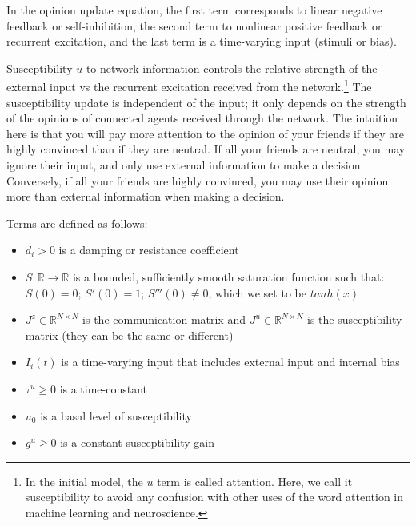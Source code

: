 \documentclass[]{article}
\begin{document}
In the opinion update equation, the first term corresponds to linear negative feedback or self-inhibition, the second term to nonlinear positive feedback or recurrent excitation, and the last term is a time-varying input (stimuli or bias).

Susceptibility $u$ to network information controls the relative strength of the external input vs the recurrent excitation received from the network.\footnote{In the initial model, the $u$ term is called attention. Here, we call it susceptibility to avoid any confusion with other uses of the word attention in machine learning and neuroscience.} The susceptibility update is independent of the input; it only depends on the strength of the opinions of connected agents received through the network. The intuition here is that you will pay more attention to the opinion of your friends if they are highly convinced than if they are neutral. If all your friends are neutral, you may ignore their input, and only use external information to make a decision. Conversely, if all your friends are highly convinced, you may use their opinion more than external information when making a decision.

Terms are defined as follows:
\begin{itemize}
	\item $d_{i} > 0$ is a damping or resistance coefficient 
	\item $S: \mathbb{R} \rightarrow \mathbb{R}$ is a bounded, sufficiently smooth saturation function such that: $S(0)=0$; $S'(0)=1$; $S'''(0)\neq0$, which we set to be $tanh(x)$
	\item $J^z \in \mathbb{R}^{N \times N}$ is the communication matrix and $J^u \in \mathbb{R}^{N \times N}$ is the susceptibility matrix (they can be the same or different)
	\item $I_i(t)$ is a time-varying input that includes external input and internal bias
	\item $\tau^u \geq 0$ is a time-constant
	\item $u_0$ is a basal level of susceptibility
	\item $g^u \geq 0$ is a constant susceptibility gain
\end{itemize}
\end{document}
